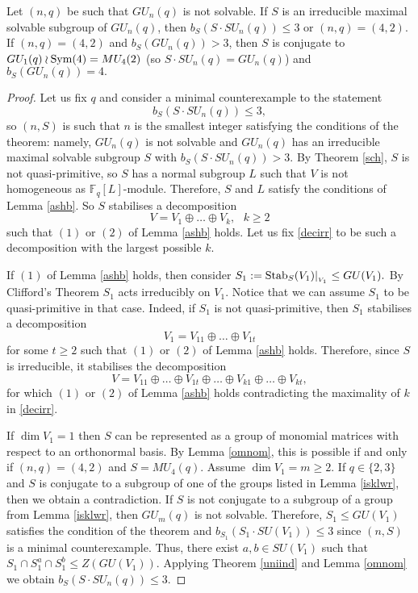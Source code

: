 \begin{Th} \label{irredGU}
Let $(n,q)$ be such that $GU_n(q)$ is not solvable. If $S$ is an irreducible maximal solvable  subgroup of $GU_n(q)$,  then $b_S(S \cdot SU_n(q)) \le 3$ or $(n,q)=(4,2)$. If $(n,q)=(4,2)$  and $b_S(GU_n(q))>3$, then  $S$ is conjugate to $GU_1(q) \wr \mathrm{Sym}(4)=MU_4(2)$ (so $S \cdot SU_n(q)=GU_n(q)$) and $b_S(GU_n(q))=4.$
\end{Th}
\begin{proof}
Let us fix $q$ and consider a minimal counterexample to the statement $$b_S(S \cdot SU_n(q)) \le 3,$$ so $(n,S)$ is such that  $n$ is the smallest integer satisfying the conditions of the theorem: namely,  $GU_n(q)$ is not solvable and $GU_n(q)$ has an irreducible maximal solvable  subgroup $S$ with $b_S(S \cdot SU_n(q))>3.$ 
By Theorem \ref{sch}, $S$ is not quasi-primitive, so  $S$ has a normal subgroup $L$ such that $V$ is not homogeneous as $\mathbb{F}_q[L]$-module. Therefore, $S$ and $L$ satisfy the conditions of Lemma \ref{ashb}. So $S$ stabilises a decomposition
\begin{equation}\label{decirr}
V=V_1 \oplus \ldots \oplus V_k, \text{ } k \ge 2
\end{equation} 
such that $(1)$ or $(2)$ of Lemma \ref{ashb} holds. %
  Let us fix \eqref{decirr} to be such a decomposition with  the largest possible $k.$  

If $(1)$ of Lemma \ref{ashb} holds, then consider $S_1:= \mathrm{Stab}_S(V_1)|_{_{V_1}} \le GU(V_1).$  By Clifford's  Theorem $S_1$ acts irreducibly on $V_1.$ Notice that we can assume $S_1$ to be quasi-primitive in that case. Indeed, if $S_1$ is not quasi-primitive, then $S_1$ stabilises a decomposition  
$$V_1=V_{11} \oplus \ldots \oplus V_{1t}$$ for some $t \ge 2$ such that  $(1)$ or $(2)$ of Lemma \ref{ashb} holds. Therefore, since $S$ is irreducible, it stabilises the  decomposition 
$$V=V_{11} \oplus \ldots \oplus V_{1t} \oplus \ldots \oplus V_{k1} \oplus \ldots \oplus V_{kt},$$
for which  $(1)$ or $(2)$ of Lemma \ref{ashb} holds contradicting the maximality of $k$ in \eqref{decirr}.

  If $\dim V_1=1$ then $S$ can be represented as a group of monomial matrices with respect to an orthonormal basis. By Lemma \ref{omnom}, this is possible if and only if $(n,q)=(4,2)$ and $S=MU_4(q).$
Assume $\dim V_1=m \ge 2.$ If $q\in \{2,3\}$ and $S$ is conjugate to a subgroup of one of the groups listed in Lemma \ref{isklwr}, then we obtain a contradiction. If $S$ is not conjugate to a subgroup of a group from Lemma \ref{isklwr}, then $GU_m(q)$ is not solvable. Therefore, $S_1\le GU(V_1)$ satisfies the condition of the theorem  
 and $b_{S_1}(S_1 \cdot SU(V_1)) \le 3$ since $(n,S)$ is a minimal counterexample. Thus, there exist $a,b \in SU(V_1)$ such that $S_1 \cap S_1^a \cap S_1^b \le Z(GU(V_1)).$ Applying Theorem \ref{uniind} and Lemma \ref{omnom} we obtain 
$b_S(S \cdot SU_n(q))\le 3.$ %


\end{proof}
